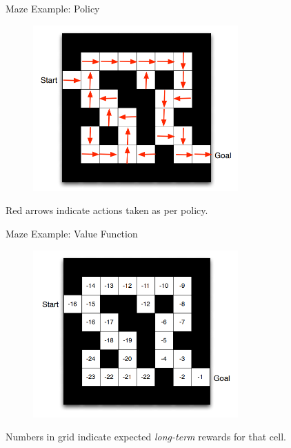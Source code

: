 \documentclass{beamer}
\begin{document}
\begin{frame}{Maze Example: Policy}
    \begin{figure}
        \centering
        \includegraphics[width=0.7\textwidth]{images/maze_policy}
    \end{figure}
    
    \centering Red arrows indicate actions taken as per policy.
\end{frame}

\begin{frame}{Maze Example: Value Function}
    \begin{figure}
        \centering
        \includegraphics[width=0.7\textwidth]{images/maze_value}
    \end{figure}
    
    \centering Numbers in grid indicate expected \emph{long-term} rewards for that cell.
\end{frame}
\end{document}
